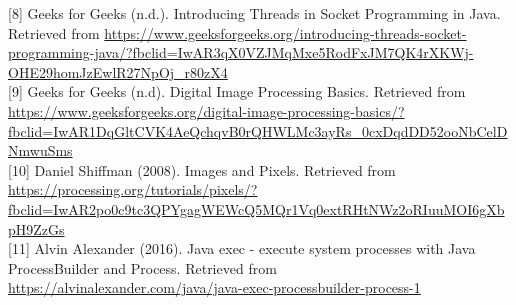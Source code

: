 \documentclass[a4paper,12pt]{article}
\begin{document}
	[8] Geeks for Geeks (n.d.). Introducing Threads in Socket Programming in Java. Retrieved from \url{https://www.geeksforgeeks.org/introducing-threads-socket-programming-java/?fbclid=IwAR3qX0VZJMqMxe5RodFxJM7QK4rXKWj-OHE29homJzEwlR27NpOj_r80zX4}\\
	
	[9]	Geeks for Geeks (n.d). Digital Image Processing Basics. Retrieved from \url{https://www.geeksforgeeks.org/digital-image-processing-basics/?fbclid=IwAR1DqGltCVK4AeQchqvB0rQHWLMc3ayRs_0cxDqdDD52ooNbCelDNmwuSms}\\
	
	[10] Daniel Shiffman (2008). Images and Pixels. Retrieved from \url{https://processing.org/tutorials/pixels/?fbclid=IwAR2po0c9tc3QPYgagWEWcQ5MQr1Vq0extRHtNWz2oRIuuMOI6gXbpH9ZzGs}\\
	
	[11] Alvin Alexander (2016). Java exec - execute system processes with Java ProcessBuilder and Process. Retrieved from \url{https://alvinalexander.com/java/java-exec-processbuilder-process-1}\\
	
\end{document}
